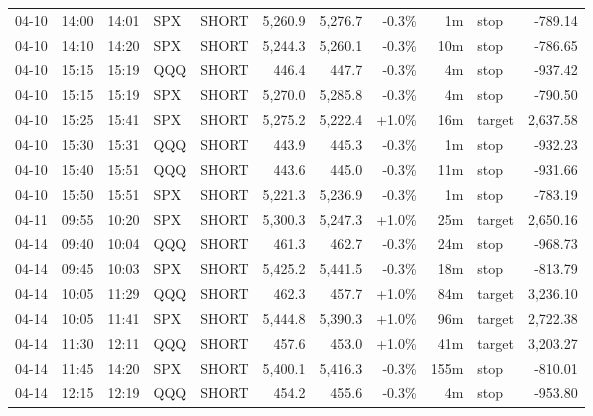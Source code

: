 \documentclass[11pt,a4paper,twoside]{article}
\begin{document}
\begin{center}
\begin{longtable}{>{\color{txtmain}}l l l l l r r r r >{\color{txtmain}}l r}
04-10 & 14:00 & 14:01 & SPX & SHORT & 5,260.9 & 5,276.7 & \textcolor{lossred}{-0.3\%} & 1m & stop & \textcolor{lossred}{-789.14} \\
04-10 & 14:10 & 14:20 & SPX & SHORT & 5,244.3 & 5,260.1 & \textcolor{lossred}{-0.3\%} & 10m & stop & \textcolor{lossred}{-786.65} \\
04-10 & 15:15 & 15:19 & QQQ & SHORT & 446.4 & 447.7 & \textcolor{lossred}{-0.3\%} & 4m & stop & \textcolor{lossred}{-937.42} \\
04-10 & 15:15 & 15:19 & SPX & SHORT & 5,270.0 & 5,285.8 & \textcolor{lossred}{-0.3\%} & 4m & stop & \textcolor{lossred}{-790.50} \\
04-10 & 15:25 & 15:41 & SPX & SHORT & 5,275.2 & 5,222.4 & \textcolor{wingreen}{+1.0\%} & 16m & target & \textcolor{wingreen}{2,637.58} \\
04-10 & 15:30 & 15:31 & QQQ & SHORT & 443.9 & 445.3 & \textcolor{lossred}{-0.3\%} & 1m & stop & \textcolor{lossred}{-932.23} \\
04-10 & 15:40 & 15:51 & QQQ & SHORT & 443.6 & 445.0 & \textcolor{lossred}{-0.3\%} & 11m & stop & \textcolor{lossred}{-931.66} \\
04-10 & 15:50 & 15:51 & SPX & SHORT & 5,221.3 & 5,236.9 & \textcolor{lossred}{-0.3\%} & 1m & stop & \textcolor{lossred}{-783.19} \\
04-11 & 09:55 & 10:20 & SPX & SHORT & 5,300.3 & 5,247.3 & \textcolor{wingreen}{+1.0\%} & 25m & target & \textcolor{wingreen}{2,650.16} \\
04-14 & 09:40 & 10:04 & QQQ & SHORT & 461.3 & 462.7 & \textcolor{lossred}{-0.3\%} & 24m & stop & \textcolor{lossred}{-968.73} \\
04-14 & 09:45 & 10:03 & SPX & SHORT & 5,425.2 & 5,441.5 & \textcolor{lossred}{-0.3\%} & 18m & stop & \textcolor{lossred}{-813.79} \\
04-14 & 10:05 & 11:29 & QQQ & SHORT & 462.3 & 457.7 & \textcolor{wingreen}{+1.0\%} & 84m & target & \textcolor{wingreen}{3,236.10} \\
04-14 & 10:05 & 11:41 & SPX & SHORT & 5,444.8 & 5,390.3 & \textcolor{wingreen}{+1.0\%} & 96m & target & \textcolor{wingreen}{2,722.38} \\
04-14 & 11:30 & 12:11 & QQQ & SHORT & 457.6 & 453.0 & \textcolor{wingreen}{+1.0\%} & 41m & target & \textcolor{wingreen}{3,203.27} \\
04-14 & 11:45 & 14:20 & SPX & SHORT & 5,400.1 & 5,416.3 & \textcolor{lossred}{-0.3\%} & 155m & stop & \textcolor{lossred}{-810.01} \\
04-14 & 12:15 & 12:19 & QQQ & SHORT & 454.2 & 455.6 & \textcolor{lossred}{-0.3\%} & 4m & stop & \textcolor{lossred}{-953.80} \\

\end{longtable}
\end{center}
\end{document}
